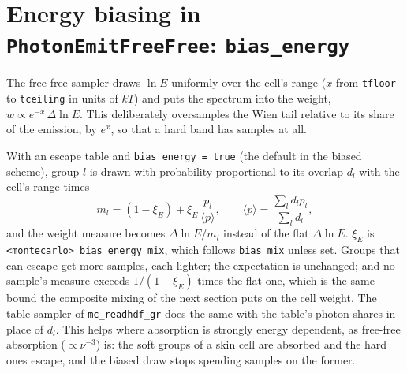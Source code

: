 \documentclass[11pt]{article}
\newcommand{\key}[1]{\texttt{#1}}
\begin{document}
\section{Energy biasing in \key{PhotonEmitFreeFree}: \key{bias\_energy}}
\label{sec:energy}

The free-free sampler draws $\ln E$ uniformly over the cell's range ($x$ from
\key{tfloor} to \key{tceiling} in units of $kT$) and puts the spectrum into the weight,
$w \propto e^{-x}\,\Delta\ln E$. This deliberately oversamples the Wien tail relative to
its share of the emission, by $e^{x}$, so that a hard band has samples at all.

With an escape table and \key{bias\_energy = true} (the default in the biased scheme),
group $l$ is drawn with probability proportional to its overlap $d_l$ with the cell's
range times
\begin{equation}
  m_l = (1-\xi_E) + \xi_E\,\frac{p_l}{\langle p\rangle},
  \qquad \langle p\rangle = \frac{\sum_l d_l p_l}{\sum_l d_l},
\end{equation}
and the weight measure becomes $\Delta\ln E / m_l$ instead of the flat $\Delta\ln E$.
$\xi_E$ is \key{<montecarlo> bias\_energy\_mix}, which follows \key{bias\_mix} unless
set. Groups that can escape get more samples, each lighter; the expectation is
unchanged; and no sample's measure exceeds $1/(1-\xi_E)$ times the flat one, which is
the same bound the composite mixing of the next section puts on the cell weight. The
table sampler of \key{mc\_readhdf\_gr} does the same with the table's photon shares in
place of $d_l$. This helps where absorption is strongly energy dependent, as free-free
absorption ($\propto \nu^{-3}$) is: the soft groups of a skin cell are absorbed and the
hard ones escape, and the biased draw stops spending samples on the former.
\end{document}
